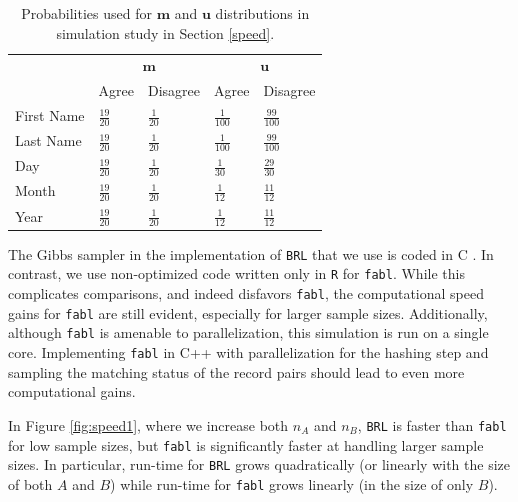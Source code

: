 \documentclass[ba]{imsart}
\begin{document}
	
	\begin{table}[t]
		\centering
		\begin{tabular}{lll|ll}
			\multicolumn{1}{c}{ } & \multicolumn{2}{c}{$\bm{m}$} & \multicolumn{2}{c}{$\bm{u}$} \\
			\cline{2-3} \cline{4-5}
			& Agree & Disagree & Agree & Disagree \\
			\hline
			First Name & $\frac{19}{20}$ & $\frac{1}{20}$ & $\frac{1}{100}$ &  $\frac{99}{100}$ \\ 
			Last Name & $\frac{19}{20}$ & $\frac{1}{20}$ & $\frac{1}{100}$ &  $\frac{99}{100}$ \\ 
			Day & $\frac{19}{20}$ & $\frac{1}{20}$ & $\frac{1}{30}$ &  $\frac{29}{30}$ \\ 
			Month & $\frac{19}{20}$ & $\frac{1}{20}$ & $\frac{1}{12}$ &  $\frac{11}{12}$ \\ 
			Year & $\frac{19}{20}$ & $\frac{1}{20}$ & $\frac{1}{12}$ &  $\frac{11}{12}$ \\  
			\hline
		\end{tabular}
		\caption{Probabilities used for $\bm{m}$ and $\bm{u}$ distributions in simulation study in Section \ref{speed}.}\label{Tab:distributions}
	\end{table}
	
	The Gibbs sampler in the implementation of \texttt{BRL} that we use is coded in C \citep{sadinle_bayesian_2017}. In contrast, we use non-optimized code written only in \texttt{R} for \texttt{fabl}.  While this complicates comparisons, and indeed disfavors \texttt{fabl}, the computational speed gains for \texttt{fabl} are still evident, especially for larger sample sizes.  Additionally, although \texttt{fabl} is amenable to parallelization, this simulation is run on a single core. Implementing \texttt{fabl} in C++ with parallelization for the hashing step and sampling the matching status of the record pairs should lead to even more computational gains.
	
	In Figure \ref{fig:speed1}, where we increase both $n_A$ and $n_B$, \texttt{BRL} is faster than \texttt{fabl} for low sample sizes, but \texttt{fabl} is significantly faster at handling larger sample sizes. In particular, run-time for \texttt{BRL} grows quadratically (or linearly with the size of both $A$ and $B$) while run-time for \texttt{fabl} grows linearly (in the size of only $B$).
	
\end{document}
